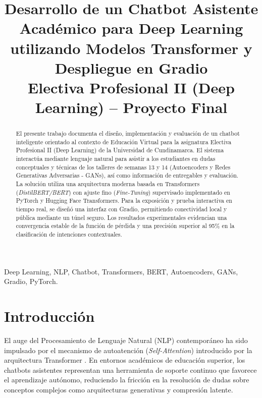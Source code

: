 \documentclass[conference]{IEEEtran}
\begin{document}
\title{Desarrollo de un Chatbot Asistente Académico para Deep Learning utilizando Modelos Transformer y Despliegue en Gradio\\
{\footnotesize Electiva Profesional II (Deep Learning) -- Proyecto Final}
}

\author{
}

\maketitle

\begin{abstract}
El presente trabajo documenta el diseño, implementación y evaluación de un chatbot inteligente orientado al contexto de Educación Virtual para la asignatura Electiva Profesional II (Deep Learning) de la Universidad de Cundinamarca. El sistema interactúa mediante lenguaje natural para asistir a los estudiantes en dudas conceptuales y técnicas de los talleres de semanas 13 y 14 (Autoencoders y Redes Generativas Adversarias - GANs), así como información de entregables y evaluación. La solución utiliza una arquitectura moderna basada en Transformers (\textit{DistilBERT/BERT}) con ajuste fino (\textit{Fine-Tuning}) supervisado implementado en PyTorch y Hugging Face Transformers. Para la exposición y prueba interactiva en tiempo real, se diseñó una interfaz con Gradio, permitiendo conectividad local y pública mediante un túnel seguro. Los resultados experimentales evidencian una convergencia estable de la función de pérdida y una precisión superior al 95\% en la clasificación de intenciones contextuales.
\end{abstract}

\begin{IEEEkeywords}
Deep Learning, NLP, Chatbot, Transformers, BERT, Autoencoders, GANs, Gradio, PyTorch.
\end{IEEEkeywords}

\section{Introducción}
El auge del Procesamiento de Lenguaje Natural (NLP) contemporáneo ha sido impulsado por el mecanismo de autoatención (\textit{Self-Attention}) introducido por la arquitectura Transformer \cite{vaswani2017}. En entornos académicos de educación superior, los chatbots asistentes representan una herramienta de soporte continuo que favorece el aprendizaje autónomo, reduciendo la fricción en la resolución de dudas sobre conceptos complejos como arquitecturas generativas y compresión latente.
\end{document}

